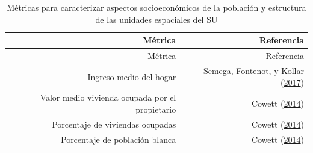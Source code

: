 \documentclass[12pt,a4paper,openany]{book}
\theoremstyle{definition}
\theoremstyle{definition}
\theoremstyle{definition}
\theoremstyle{remark}
\begin{document}
\begin{longtable}[]{@{}rr@{}}
\caption{\label{tab:ind-SoEc} Métricas para caracterizar aspectos
socioeconómicos de la población y estructura de las unidades espaciales
del SU}\tabularnewline
\toprule
\begin{minipage}[b]{0.57\columnwidth}\raggedleft\strut
Métrica\strut
\end{minipage} & \begin{minipage}[b]{0.31\columnwidth}\raggedleft\strut
Referencia\strut
\end{minipage}\tabularnewline
\midrule
\endfirsthead
\toprule
\begin{minipage}[b]{0.57\columnwidth}\raggedleft\strut
Métrica\strut
\end{minipage} & \begin{minipage}[b]{0.31\columnwidth}\raggedleft\strut
Referencia\strut
\end{minipage}\tabularnewline
\midrule
\endhead
\begin{minipage}[t]{0.57\columnwidth}\raggedleft\strut
Ingreso medio del hogar\strut
\end{minipage} & \begin{minipage}[t]{0.31\columnwidth}\raggedleft\strut
Semega, Fontenot, y Kollar
(\protect\hyperlink{ref-semega2017income}{2017})\strut
\end{minipage}\tabularnewline
\begin{minipage}[t]{0.57\columnwidth}\raggedleft\strut
Valor medio vivienda ocupada por el propietario\strut
\end{minipage} & \begin{minipage}[t]{0.31\columnwidth}\raggedleft\strut
Cowett (\protect\hyperlink{ref-cowett_methodology_2014}{2014})\strut
\end{minipage}\tabularnewline
\begin{minipage}[t]{0.57\columnwidth}\raggedleft\strut
Porcentaje de viviendas ocupadas\strut
\end{minipage} & \begin{minipage}[t]{0.31\columnwidth}\raggedleft\strut
Cowett (\protect\hyperlink{ref-cowett_methodology_2014}{2014})\strut
\end{minipage}\tabularnewline
\begin{minipage}[t]{0.57\columnwidth}\raggedleft\strut
Porcentaje de población blanca\strut
\end{minipage} & \begin{minipage}[t]{0.31\columnwidth}\raggedleft\strut
Cowett (\protect\hyperlink{ref-cowett_methodology_2014}{2014})\strut

\end{minipage}
\end{longtable}
\end{document}
